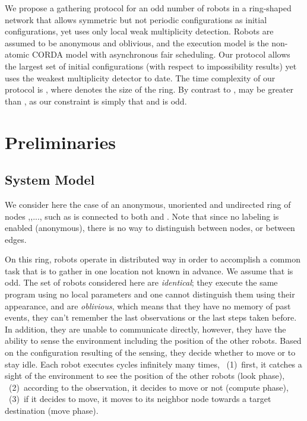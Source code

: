 \documentclass[11pt]{article}
\begin{document}
We propose a gathering protocol for an odd number of robots in a ring-shaped network that allows symmetric but not periodic configurations as initial configurations, yet uses only local weak multiplicity detection. Robots are assumed to be anonymous and oblivious, and the execution model is the non-atomic CORDA model with asynchronous fair scheduling. Our protocol allows the largest set of initial configurations (with respect to impossibility results) yet uses the weakest multiplicity detector to date. The time complexity of our protocol is , where  denotes the size of the ring. By contrast to \cite{Izumi10},  may be greater than , as our constraint is simply that  and  is odd.

\section{Preliminaries}

\subsection{System Model}\label{sec:Model}
We consider here the case of an anonymous, unoriented and undirected ring of  nodes ,,...,  such as  is connected to both  and . 
Note that since no labeling is enabled (anonymous), there is no way to distinguish between nodes, or between edges. 

On this ring,  robots operate in distributed way in order to accomplish a common task that is to gather in one location not known in advance. 
We assume that  is odd.
The set of robots considered here are \textit{identical}; they execute the same program using no local parameters and one cannot distinguish them using their appearance, and are \textit{oblivious}, which means that they have no memory of past events, they can't remember the last observations or the last steps taken before. 
In addition, they are unable to communicate directly, however, they have the ability to sense the environment including the position of the other robots. 
Based on the configuration resulting of the sensing, they decide whether to move or to stay idle. 
Each robot executes cycles infinitely many times, 
~(1)~first, it catches a sight of the environment to see the position of the other robots (look phase), 
~(2)~according to the observation, it decides to move or not (compute phase), 
~(3)~if it decides to move, it moves to its neighbor node towards a target destination (move phase). 
\end{document}
